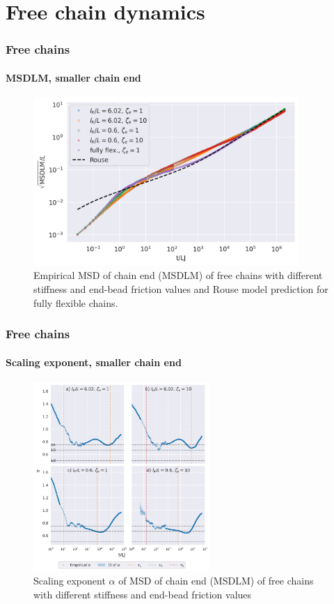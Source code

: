 \documentclass[handout]{beamer}
\begin{document}
\section{Free chain dynamics}


\begin{frame}
    \frametitle{Free chains}
    \framesubtitle{MSDLM, smaller chain end}
    \begin{figure}[h]
        \includegraphics[width=0.9\textwidth]{17+18+19+20-exp-msd-fm-log.png}
        \caption{
            Empirical MSD of chain end (MSDLM) of free chains
            with different stiffness and end-bead friction values and
            Rouse model prediction for fully flexible chains.
        }
    \end{figure}
\end{frame}


\begin{frame}
    \frametitle{Free chains}
    \framesubtitle{Scaling exponent, smaller chain end}
    \begin{figure}
        \centering
        \includegraphics[width=0.6\textwidth]{17+18+19+20-exp-alpha-fm.png}
        \caption{Scaling exponent $\alpha$ of MSD of chain end (MSDLM) 
        of free chains with different stiffness and end-bead friction values
        }
        \label{fig:alpha_fm_free}
    \end{figure}
\end{frame}
\end{document}
